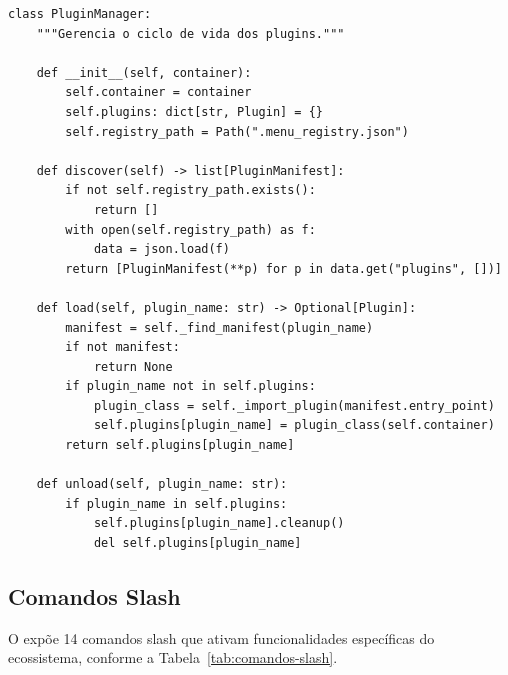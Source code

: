\begin{lstlisting}[style=pythonstyle, caption={Gerenciador de plugins},
                   label={lst:plugin-manager}]
class PluginManager:
    """Gerencia o ciclo de vida dos plugins."""

    def __init__(self, container):
        self.container = container
        self.plugins: dict[str, Plugin] = {}
        self.registry_path = Path(".menu_registry.json")

    def discover(self) -> list[PluginManifest]:
        if not self.registry_path.exists():
            return []
        with open(self.registry_path) as f:
            data = json.load(f)
        return [PluginManifest(**p) for p in data.get("plugins", [])]

    def load(self, plugin_name: str) -> Optional[Plugin]:
        manifest = self._find_manifest(plugin_name)
        if not manifest:
            return None
        if plugin_name not in self.plugins:
            plugin_class = self._import_plugin(manifest.entry_point)
            self.plugins[plugin_name] = plugin_class(self.container)
        return self.plugins[plugin_name]

    def unload(self, plugin_name: str):
        if plugin_name in self.plugins:
            self.plugins[plugin_name].cleanup()
            del self.plugins[plugin_name]
\end{lstlisting}

\subsection{Comandos Slash}
\label{subsec:comandos-slash}

O \opencodeeco{} expõe 14 comandos slash que ativam funcionalidades
específicas do ecossistema, conforme a Tabela~\ref{tab:comandos-slash}.


